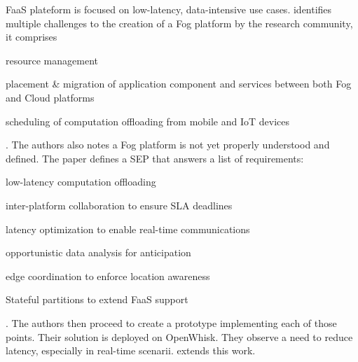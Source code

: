 \documentclass[11pt]{sdm}
\begin{document}
\citet{baresi_paps_2019, baresi_towards_2019} \gls{FaaS} plateform is focused on low-latency, data-intensive use cases. \cite{baresi_towards_2019} identifies multiple challenges to the creation of a Fog platform by the research community, it comprises
\begin{enumerate*}
	\item resource management
	\item placement \& migration of application component and services between both Fog and Cloud platforms
	\item scheduling of computation offloading from mobile and \gls{IoT} devices
\end{enumerate*}. The authors also notes a Fog platform is not yet properly understood and defined.
The paper defines a \gls{SEP} that answers a list of requirements:
\begin{enumerate*}
	\item low-latency computation offloading
	\item inter-platform collaboration to ensure \gls{SLA} deadlines
	\item latency optimization to enable real-time communications
	\item opportunistic data analysis for anticipation
	\item edge coordination to enforce location awareness
	\item Stateful partitions to extend \gls{FaaS} support
\end{enumerate*}.
The authors then proceed to create a prototype implementing each of those points. Their solution is deployed on OpenWhisk. They observe a need to reduce latency, especially in real-time scenarii. \citet{baresi_paps_2019} extends this work.
\end{document}
